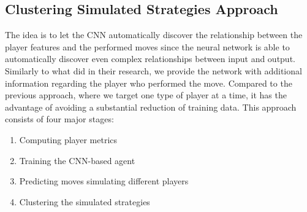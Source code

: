 \subsection{Clustering Simulated Strategies Approach}
The idea is to let the \acs{CNN} automatically discover the relationship between the player features and the performed moves since the neural network is able to automatically discover even complex relationships between input and output. Similarly to what \textcite{maddison_move_2014} did in their research, we provide the network with additional information regarding the player who performed the move. Compared to the previous approach, where we target one type of player at a time, it has the advantage of avoiding a substantial reduction of training data.
This approach consists of four major stages:

\begin{enumerate}
    \item Computing player metrics
    \item Training the \acs{CNN}-based agent
    \item Predicting moves simulating different players
    \item Clustering the simulated strategies
\end{enumerate}


